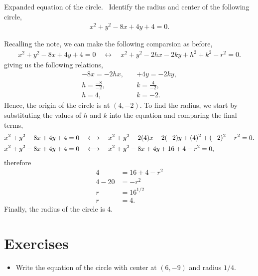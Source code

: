 \documentclass[../main-exe.tex]{subfiles}
\begin{document}
\begin{example}{Expanded equation of the circle.}{~}
    Identify the radius and center of the following circle,
    \begin{gather*}
        x^2 + y^2 -8x +4y +4 = 0. 
    \end{gather*}

    Recalling the note, we can make the following comparsion as before,
    \begin{gather*}
        x^2 + y^2 -8x +4y +4 = 0\quad\longleftrightarrow\quad x^2 + y^2 -2hx -2ky + h^2 + k^2 -r^2 = 0.
    \end{gather*}
    giving us the following relations,
    \begin{align*}
        -8x = -2hx,\quad & +4y = -2ky, \\
        h = \frac{-8}{-2},\quad & k = \frac{4}{-2}, \\
        h = 4,\quad & k = -2.
    \end{align*}
    Hence, the origin of the circle is at $(4,-2)$.
    To find the radius, we start by substituting the values of $h$ and $k$ into the equation and comparing the final terms,
    \begin{align*}
        x^2 + y^2 -8x +4y +4 = 0\quad&\longleftrightarrow\quad x^2 + y^2 -2\qty(4)x -2\qty(-2)y + (4)^2 + (-2)^2 -r^2 = 0. \\
        x^2 + y^2 -8x +4y +4 = 0\quad&\longleftrightarrow\quad x^2 + y^2 -8x +4y + 16 + 4 -r^2 = 0,
    \end{align*}
    therefore
    \begin{align*}
        4 &= 16 + 4 -r^2 \\
        4 - 20 &= -r^2 \\
        r &= 16^{1/2} \\
        r &= 4.
    \end{align*}
    Finally, the radius of the circle is 4.

\end{example}



\section{Exercises}

\begin{itemize}
    \item Write the equation of the circle with center at $(6,-9)$ and radius $1/4$.
\end{itemize}
\end{document}
